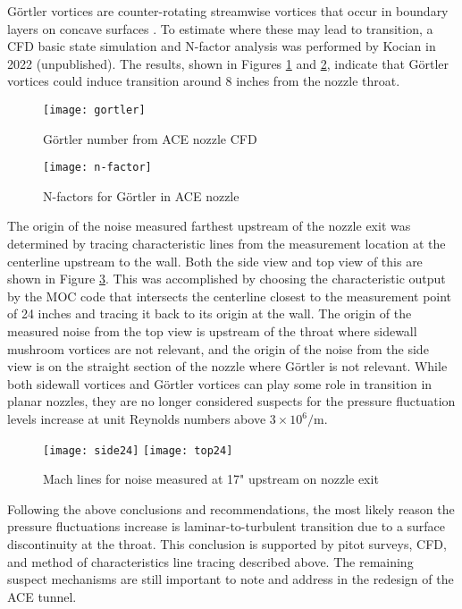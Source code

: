 Görtler vortices are counter-rotating streamwise vortices that occur in boundary layers on concave surfaces \cite{saric}. To estimate where these may lead to transition, a CFD basic state simulation and N-factor analysis was performed by Kocian in 2022 (unpublished). The results, shown in Figures \ref{fig:gortler} and \ref{fig:n-factor}, indicate that Görtler vortices could induce transition around 8 inches from the nozzle throat. 

\begin{figure}[ht!]
    \centering
    \texttt{[image: gortler]}
    \caption{Görtler number from ACE nozzle CFD}
    \label{fig:gortler}
\end{figure}

\begin{figure}[ht!]
    \centering
    \texttt{[image: n-factor]}
    \caption{N-factors for Görtler in ACE nozzle}
    \label{fig:n-factor}
\end{figure}

The origin of the noise measured farthest upstream of the nozzle exit was determined by tracing characteristic lines from the measurement location at the centerline upstream to the wall. Both the side view and top view of this are shown in Figure \ref{fig:machlines}. This was accomplished by choosing the characteristic output by the MOC code that intersects the centerline closest to the measurement point of 24 inches and tracing it back to its origin at the wall. The origin of the measured noise from the top view is upstream of the throat where sidewall mushroom vortices are not relevant, and the origin of the noise from the side view is on the straight section of the nozzle where Görtler is not relevant. While both sidewall vortices and Görtler vortices can play some role in transition in planar nozzles, they are no longer considered suspects for the pressure fluctuation levels increase at unit Reynolds numbers above $3 \times 10^6/\mathrm{m}$.

\begin{figure}[ht!]
    \centering
    \texttt{[image: side24]}
    \texttt{[image: top24]}
    \caption{Mach lines for noise measured at 17" upstream on nozzle exit}
    \label{fig:machlines}
\end{figure}

Following the above conclusions and recommendations, the most likely reason the pressure fluctuations increase is laminar-to-turbulent transition due to a surface discontinuity at the throat. This conclusion is supported by pitot surveys, CFD, and method of characteristics line tracing described above. The remaining suspect mechanisms are still important to note and address in the redesign of the ACE tunnel. 

